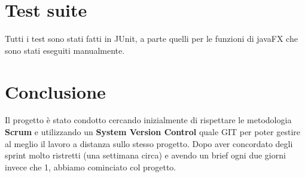 \documentclass[12pt, a4paper]{article}
\begin{document}
\section{Test suite}

Tutti i test sono stati fatti in JUnit, a parte quelli per le funzioni di javaFX che sono stati eseguiti manualmente.


\section{Conclusione}
Il progetto è stato condotto cercando inizialmente di rispettare le metodologia \textbf{Scrum} e utilizzando un \textbf{System Version Control} quale GIT per poter gestire al meglio il lavoro a distanza sullo stesso progetto. Dopo aver concordato degli sprint molto ristretti (una settimana circa) e avendo un brief ogni due giorni invece che 1, abbiamo cominciato col progetto.
\end{document}
